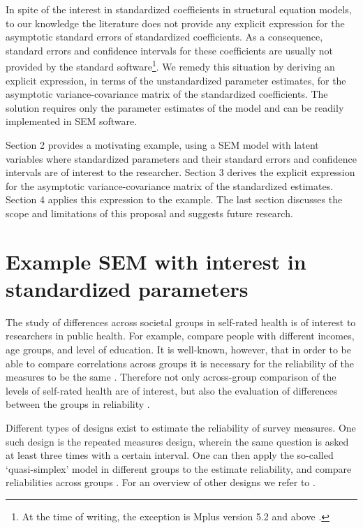 \documentclass[a4paper, 11pt]{article}
\newcommand{\0}{\boldsymbol{0}}
\begin{document}
In spite of the interest in standardized coefficients in structural equation models, to our knowledge the literature does not provide any explicit expression for the asymptotic standard errors of standardized coefficients. As a consequence, standard errors and confidence intervals for these coefficients are usually not provided by the standard software\footnote{At the time of writing, the exception is Mplus version 5.2 and above \citep{muthen1998mplus}.}.  We remedy this situation by deriving an explicit expression, in terms of the unstandardized parameter estimates, for the asymptotic variance-covariance matrix of the standardized coefficients. The solution requires only the parameter estimates of the model and can be readily implemented in SEM software.

Section 2 provides a motivating example, using a SEM model with latent
variables where standardized parameters and their standard errors and confidence
intervals are of interest to the researcher.
Section 3 derives the explicit expression for the asymptotic variance-covariance matrix of the standardized estimates. Section 4 applies this expression to the example. The last section discusses the scope and limitations of this proposal and suggests future research.


\section{Example SEM with interest in standardized parameters} 


The study of differences across societal groups in self-rated health is of interest to researchers in public health.   For example,  \cite{von2006education} 
compare people with different incomes, age groups, and level of education.
It is well-known, however, that in order to be able to compare correlations across groups it is necessary for the reliability of 
the measures to be the same \citep[e.g.][]{saris_design_2007}. Therefore not only across-group comparison of the levels of self-rated health are of interest, 
but also the evaluation of differences between the groups in reliability \citep{lundberg1996assessing}. 

Different types of designs exist to estimate the reliability of survey measures. One such design is the repeated measures design, wherein the
same question is asked at least three times with a certain interval. One can then apply the so-called `quasi-simplex' model in different groups to the estimate
reliability, and compare reliabilities across groups \citep{heise1970validity,wiley35wiley}. For an overview of other designs we refer to \cite{alwin_margins_2007}. 
\end{document}
